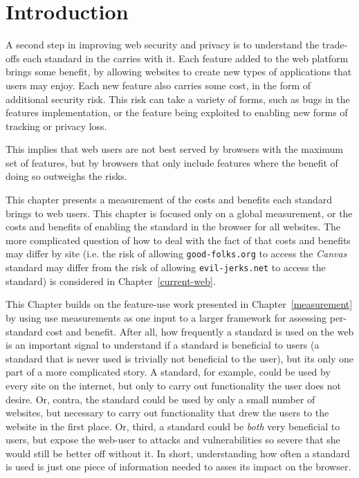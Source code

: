 \section{Introduction}
\label{cost-benefit:introduction}

A second step in improving web security and privacy is to understand the
trade-offs each standard in the \WAPI carries with it.
Each feature added to the web platform brings some benefit,
by allowing websites to create new types of applications that users
may enjoy.  Each new feature also carries some cost, in the form of additional
security risk.  This risk can take a variety of forms, such as bugs in the
features implementation, or the feature being exploited to enabling new forms
of tracking or privacy loss.

This implies that web users are not best served by browsers with the maximum
set of features, but by browsers that only include features where the benefit
of doing so outweighs the risks.

This chapter presents a measurement of the costs and benefits each standard
brings to web users.  This chapter is focused only on a global measurement,
or the costs and benefits of enabling the standard in the browser for all
websites.  The more complicated question of how to deal with the fact of that
costs and benefits may differ by site (i.e. the risk of allowing
\texttt{good-folks.org} to access the \textit{Canvas} standard may differ
from the risk of allowing \texttt{evil-jerks.net} to access the standard)
is considered in Chapter~\ref{current-web}.

This Chapter builds on the feature-use work presented in
Chapter~\ref{measurement} by using \WAPI use measurements as one input to a
larger framework for assessing per-standard cost and benefit. After all, how
frequently a standard is used on the web is an important signal to understand
if a standard is beneficial to users (a \WAPI standard that is never used is
trivially not beneficial to the user), but its only one part of a more
complicated story.  A standard, for example, could be used by every site on the
internet, but only to carry out functionality the user does not desire. Or,
contra, the standard could be used by only a small number of websites, but
necessary to carry out functionality that drew the users to the website in the
first place.  Or, third, a standard could be \emph{both} very beneficial to
users, but expose the web-user to attacks and vulnerabilities so severe that
she would still be better off without it.  In short, understanding how often a
\WAPI standard is used is just one piece of information needed to asses its
impact on the browser.

